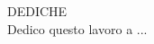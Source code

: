 \thispagestyle{empty}
{}

\vspace*{3cm}
\begin{center}
	DEDICHE \\ \medskip
	Dedico questo lavoro a ... \\
\end{center}